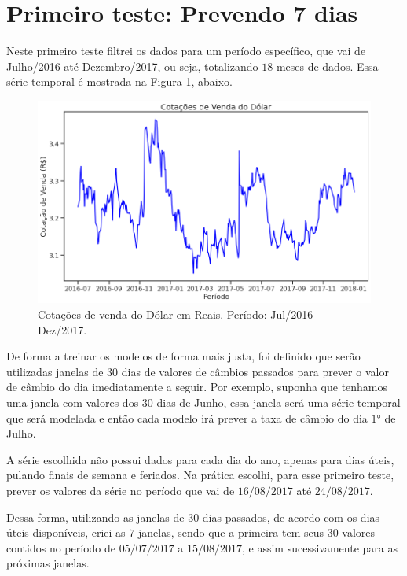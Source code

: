 \section{Primeiro teste: Prevendo 7 dias}

Neste primeiro teste filtrei os dados para um período específico, que vai de Julho/2016 até Dezembro/2017, ou seja, totalizando $18$ meses de dados. Essa série temporal é mostrada na Figura \ref{fig:serie_1}, abaixo.

\begin{figure}[htb]
\centering
\includegraphics[width=13.1cm]{figuras/serie_1}
\caption{Cotações de venda do Dólar em Reais. Período: Jul/2016 - Dez/2017.}
\label{fig:serie_1}
\end{figure}

De forma a treinar os modelos de forma mais justa, foi definido que serão utilizadas janelas de $30$ dias de valores de câmbios passados para prever o valor de câmbio do dia imediatamente a seguir. Por exemplo, suponha que tenhamos uma janela com valores dos $30$ dias de Junho, essa janela será uma série temporal que será modelada e então cada modelo irá prever a taxa de câmbio do dia $1$° de Julho.

A série escolhida não possui dados para cada dia do ano, apenas para dias úteis, pulando finais de semana e feriados. Na prática escolhi, para esse primeiro teste, prever os valores da série no período que vai de $16/08/2017$ até $24/08/2017$.

Dessa forma, utilizando as janelas de $30$ dias passados, de acordo com os dias úteis disponíveis, criei as $7$ janelas, sendo que a primeira tem seus $30$ valores contidos no período de $05/07/2017$ a $15/08/2017$, e assim sucessivamente para as próximas janelas.

